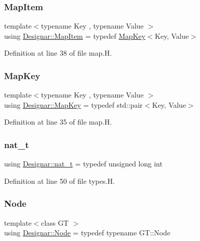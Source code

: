 \subsubsection{\texorpdfstring{Map\+Item}{MapItem}}
{\footnotesize\ttfamily template$<$typename Key , typename Value $>$ \\
using \hyperlink{namespace_designar_abc6ea5602461a15100a645d1f0e5cbcb}{Designar\+::\+Map\+Item} = typedef \hyperlink{namespace_designar_a7394b1b25278abf7211e77b91eb5204f}{Map\+Key}$<$Key, Value$>$}



Definition at line 38 of file map.\+H.

\mbox{\label{namespace_designar_a7394b1b25278abf7211e77b91eb5204f}} 
\subsubsection{\texorpdfstring{Map\+Key}{MapKey}}
{\footnotesize\ttfamily template$<$typename Key , typename Value $>$ \\
using \hyperlink{namespace_designar_a7394b1b25278abf7211e77b91eb5204f}{Designar\+::\+Map\+Key} = typedef std\+::pair$<$Key, Value$>$}



Definition at line 35 of file map.\+H.

\mbox{\label{namespace_designar_aa72662848b9f4815e7bf31a7cf3e33d1}} 
\subsubsection{\texorpdfstring{nat\+\_\+t}{nat\_t}}
{\footnotesize\ttfamily using \hyperlink{namespace_designar_aa72662848b9f4815e7bf31a7cf3e33d1}{Designar\+::nat\+\_\+t} = typedef unsigned long int}



Definition at line 50 of file types.\+H.

\mbox{\label{namespace_designar_a5af326c65aa2bd26b26c410f2030d09e}} 
\subsubsection{\texorpdfstring{Node}{Node}}
{\footnotesize\ttfamily template$<$class GT $>$ \\
using \hyperlink{namespace_designar_a5af326c65aa2bd26b26c410f2030d09e}{Designar\+::\+Node} = typedef typename G\+T\+::\+Node}



